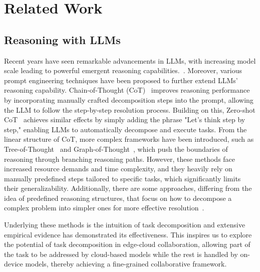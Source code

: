 \section{Related Work}

\subsection{Reasoning with LLMs}

Recent years have seen remarkable advancements in LLMs, with increasing model scale leading to powerful emergent reasoning capabilities.~\cite{wei2022emergent, xu2025towards}. Moreover, various prompt engineering techniques have been proposed to further extend LLMs' reasoning capability.
Chain-of-Thought (CoT)~\cite{wei2022chain} improves reasoning performance by incorporating manually crafted decomposition steps into the prompt, allowing the LLM to follow the step-by-step resolution process. Building on this, Zero-shot CoT~\cite{kojima2022large} achieves similar effects by simply adding the phrase "Let's think step by step," enabling LLMs to automatically decompose and execute tasks.
From the linear structure of CoT, more complex frameworks have been introduced, such as Tree-of-Thought~\cite{yao2023tree} and Graph-of-Thought~\cite{besta2024graph}, which push the boundaries of reasoning through branching reasoning paths. However, these methods face increased resource demands and time complexity, and they heavily rely on manually predefined steps tailored to specific tasks, which significantly limits their generalizability. Additionally, there are some approaches, differing from the idea of predefined reasoning structures, that focus on how to decompose a complex problem into simpler ones for more effective resolution~\cite{ zhou2022least, khot2022decomposed, shang2024agentsquare, shang2024defint}.

Underlying these methods is the intuition of task decomposition and extensive empirical evidence has demonstrated its effectiveness. This inspires us to explore the potential of task decomposition in edge-cloud collaboration, allowing part of the task to be addressed by cloud-based models while the rest is handled by on-device models, thereby achieving a fine-grained collaborative framework.


